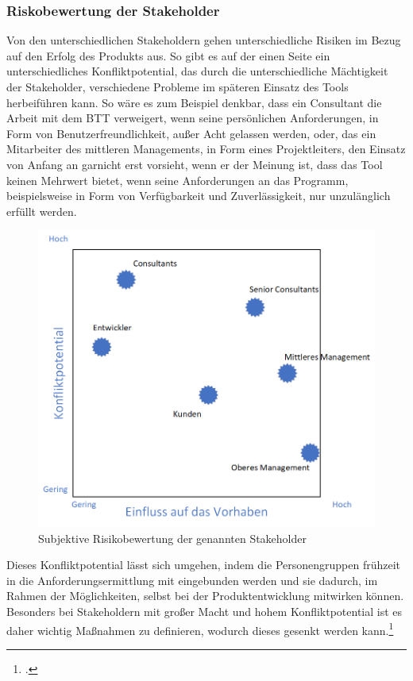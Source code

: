 \subsubsection{Riskobewertung der Stakeholder}
Von den unterschiedlichen Stakeholdern gehen unterschiedliche Risiken im Bezug auf den Erfolg des Produkts aus. So gibt es auf der einen Seite ein unterschiedliches Konfliktpotential, das durch die unterschiedliche Mächtigkeit der Stakeholder, verschiedene Probleme im späteren Einsatz des Tools herbeiführen kann. So wäre es zum Beispiel denkbar, dass ein Consultant die Arbeit mit dem BTT verweigert, wenn seine persönlichen Anforderungen, in Form von Benutzerfreundlichkeit, außer Acht gelassen werden, oder, das ein Mitarbeiter des mittleren Managements, in Form eines Projektleiters, den Einsatz von Anfang an garnicht erst vorsieht, wenn er der Meinung ist, dass das Tool keinen Mehrwert bietet, wenn seine Anforderungen an das Programm, beispielsweise in Form von Verfügbarkeit und Zuverlässigkeit, nur unzulänglich erfüllt werden.
\begin{figure}[h]
    \centering
    \includegraphics[scale=0.67]{Bilder/stakeholderRisiko.png}
    \caption[]{Subjektive Risikobewertung der genannten Stakeholder}
\end{figure}
Dieses Konfliktpotential lässt sich umgehen, indem die Personengruppen frühzeit in die Anforderungsermittlung mit eingebunden werden und sie dadurch, im Rahmen der Möglichkeiten, selbst bei der Produktentwicklung mitwirken können. Besonders bei Stakeholdern mit großer Macht und hohem Konfliktpotential ist es daher wichtig Maßnahmen zu definieren, wodurch dieses gesenkt werden kann.\footcite[Vgl.][S. 504 f.]{balzert}



